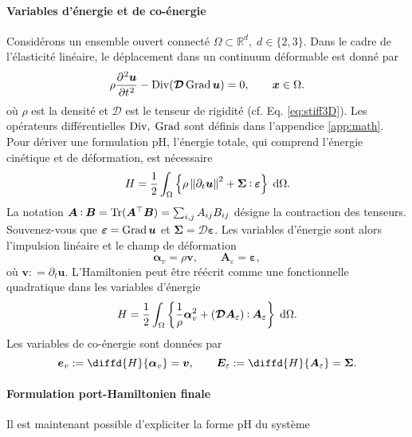 \paragraph{Variables d'énergie et de co-énergie}
Considérons un ensemble ouvert connecté $\Omega \subset \mathbb{R}^d, \; d \in \{2,3 \} $. Dans le cadre de l'élasticité linéaire, le déplacement dans un continuum déformable est donné par
\begin{equation}
\rho \diffp[2]{\bm{u}}{t} - \Div(\bm{\mathcal{D}} \Grad \bm{u}) = 0, \qquad \bm{x} \in \Omega.
\end{equation}
où $\rho$ est la densité et $\bm{\mathcal{D}}$ est le tenseur de rigidité (cf. Eq. \ref{eq:stiff3D}). Les opérateurs différentielles $\operatorname*{Div}, \; \operatorname*{Grad}$ sont définis dans l'appendice \ref{app:math}. Pour dériver une formulation pH, l'énergie totale, qui comprend l'énergie cinétique et de déformation, est nécessaire
\begin{equation}
	H = \energy {\rho \norm{\partial_t \bm{u}}^2 + \bm{\Sigma} \cddot \bm{\varepsilon}}.
\end{equation}
La notation $ \bm{A} \cddot \bm{B} = \Tr (\bm{A}^\top \bm{B}) = \sum_{i, j} A_{ij} B_{ij} $ désigne la contraction des tenseurs. Souvenez-vous que $\bm{\varepsilon} = \operatorname*{Grad} {\bm{u}} $ et $ \bm{\Sigma} = \bm{\mathcal{D}} \bm{\varepsilon}$. Les variables d'énergie sont alors l'impulsion linéaire et le champ de déformation
\begin{equation*}
\bm{\alpha}_v = \rho \bm{v}, \qquad \bm{A}_{\varepsilon} = \bm{\varepsilon},
\end{equation*}
où $ \bm{v}: = \partial_t \bm{u}$. L'Hamiltonien peut être réécrit comme une fonctionnelle quadratique dans les variables d'énergie
\begin{equation}
H = \energy{\frac{1}{\rho} \bm{\alpha}_v^2 + (\bm{\mathcal{D}} \bm{A}_{\varepsilon}) \cddot \bm{A}_{\varepsilon}}.
\end{equation}
Les variables de co-énergie sont données par
\begin{equation}
\bm{e}_v: = \diffd{H}{\bm{\alpha}_v} = \bm{v}, \qquad \bm{E}_\varepsilon: = \diffd{H}{\bm{A}_{\varepsilon}} = \bm{\Sigma}.
\end{equation}

\paragraph{Formulation port-Hamiltonien finale}
Il est maintenant possible d'expliciter la forme pH du système

